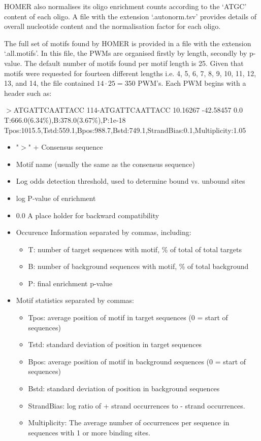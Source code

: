 \documentclass[12pt]{article}
\begin{document}
HOMER also normalises its oligo enrichment counts according to the `ATGC' content of each oligo. A file with the extension `.autonorm.tsv' provides details of overall nucleotide content and the normalisation factor for each oligo.

The full set of motifs found by HOMER is provided in a file with the extension `.all.motifs'. In this file, the PWMs are organised firstly by length, secondly by p-value. The default number of motifs found per motif length is 25. Given that motifs were requested for fourteen different lengths i.e. 4, 5, 6, 7, 8, 9, 10, 11, 12, 13, and 14, the file contained $14 \cdot 25 = 350$ PWM's. Each PWM begins with a header such as: 


$>$ATGATTCAATTACC	114-ATGATTCAATTACC	
10.16267	-42.58457	0.0\\	T:666.0(6.34\%),B:378.0(3.67\%),P:1e-18\\ Tpos:1015.5,Tstd:559.1,Bpos:988.7,Bstd:749.1,StrandBias:0.1,Multiplicity:1.05
\begin{itemize}
\item"$>$" + Consensus sequence 
\item Motif name (usually the same as the consensus sequence)
\item Log odds detection threshold, used to determine bound vs. unbound sites 
\item log P-value of enrichment
\item 0.0  A place holder for backward compatibility
\item Occurence Information separated by commas, including:
\begin{itemize}
\item T: number of target sequences with motif, \% of total of total targets
\item B: number of background sequences with motif, \% of total background
\item P: final enrichment p-value
\end{itemize}
\item Motif statistics separated by commas: 
\begin{itemize}
\item Tpos: average position of motif in target sequences (0 = start of sequences)
\item Tstd: standard deviation of position in target sequences
\item Bpos: average position of motif in background sequences (0 = start of sequences)
\item Bstd: standard deviation of position in background sequences
\item StrandBias: log ratio of + strand occurrences to - strand occurrences.
\item Multiplicity: The average number of occurrences per sequence in sequences with 1 or more binding sites.
\end{itemize}
\end{itemize}
\end{document}
